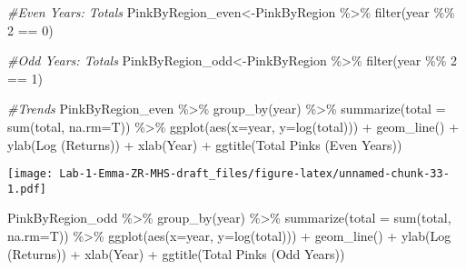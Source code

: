 \documentclass[
]{article}
\newenvironment{Shaded}{\begin{snugshade}}{\end{snugshade}}
\newcommand{\AttributeTok}[1]{\textcolor[rgb]{0.77,0.63,0.00}{#1}}
\newcommand{\CommentTok}[1]{\textcolor[rgb]{0.56,0.35,0.01}{\textit{#1}}}
\newcommand{\DecValTok}[1]{\textcolor[rgb]{0.00,0.00,0.81}{#1}}
\newcommand{\FunctionTok}[1]{\textcolor[rgb]{0.00,0.00,0.00}{#1}}
\newcommand{\NormalTok}[1]{#1}
\newcommand{\OtherTok}[1]{\textcolor[rgb]{0.56,0.35,0.01}{#1}}
\newcommand{\SpecialCharTok}[1]{\textcolor[rgb]{0.00,0.00,0.00}{#1}}
\newcommand{\StringTok}[1]{\textcolor[rgb]{0.31,0.60,0.02}{#1}}
\begin{document}
\begin{Shaded}
\begin{Highlighting}[]
\CommentTok{\#Even Years: Totals }
\NormalTok{PinkByRegion\_even}\OtherTok{\textless{}{-}}\NormalTok{PinkByRegion }\SpecialCharTok{\%\textgreater{}\%} 
  \FunctionTok{filter}\NormalTok{(year }\SpecialCharTok{\%\%} \DecValTok{2} \SpecialCharTok{==} \DecValTok{0}\NormalTok{)}

\CommentTok{\#Odd Years: Totals }
\NormalTok{PinkByRegion\_odd}\OtherTok{\textless{}{-}}\NormalTok{PinkByRegion }\SpecialCharTok{\%\textgreater{}\%} 
  \FunctionTok{filter}\NormalTok{(year }\SpecialCharTok{\%\%} \DecValTok{2} \SpecialCharTok{==} \DecValTok{1}\NormalTok{)}

\CommentTok{\#Trends}
\NormalTok{PinkByRegion\_even }\SpecialCharTok{\%\textgreater{}\%}
  \FunctionTok{group\_by}\NormalTok{(year) }\SpecialCharTok{\%\textgreater{}\%}
  \FunctionTok{summarize}\NormalTok{(}\AttributeTok{total =} \FunctionTok{sum}\NormalTok{(total, }\AttributeTok{na.rm=}\NormalTok{T)) }\SpecialCharTok{\%\textgreater{}\%}
  \FunctionTok{ggplot}\NormalTok{(}\FunctionTok{aes}\NormalTok{(}\AttributeTok{x=}\NormalTok{year, }\AttributeTok{y=}\FunctionTok{log}\NormalTok{(total))) }\SpecialCharTok{+}
  \FunctionTok{geom\_line}\NormalTok{() }\SpecialCharTok{+}
  \FunctionTok{ylab}\NormalTok{(}\StringTok{\textquotesingle{}Log (Returns)\textquotesingle{}}\NormalTok{) }\SpecialCharTok{+}
  \FunctionTok{xlab}\NormalTok{(}\StringTok{\textquotesingle{}Year\textquotesingle{}}\NormalTok{) }\SpecialCharTok{+}
  \FunctionTok{ggtitle}\NormalTok{(}\StringTok{\textquotesingle{}Total Pinks (Even Years)\textquotesingle{}}\NormalTok{)}
\end{Highlighting}
\end{Shaded}

\texttt{[image: Lab-1-Emma-ZR-MHS-draft\_files/figure-latex/unnamed-chunk-33-1.pdf]}

\begin{Shaded}
\begin{Highlighting}[]
\NormalTok{PinkByRegion\_odd }\SpecialCharTok{\%\textgreater{}\%}
  \FunctionTok{group\_by}\NormalTok{(year) }\SpecialCharTok{\%\textgreater{}\%}
  \FunctionTok{summarize}\NormalTok{(}\AttributeTok{total =} \FunctionTok{sum}\NormalTok{(total, }\AttributeTok{na.rm=}\NormalTok{T)) }\SpecialCharTok{\%\textgreater{}\%}
  \FunctionTok{ggplot}\NormalTok{(}\FunctionTok{aes}\NormalTok{(}\AttributeTok{x=}\NormalTok{year, }\AttributeTok{y=}\FunctionTok{log}\NormalTok{(total))) }\SpecialCharTok{+}
  \FunctionTok{geom\_line}\NormalTok{() }\SpecialCharTok{+}
  \FunctionTok{ylab}\NormalTok{(}\StringTok{\textquotesingle{}Log (Returns)\textquotesingle{}}\NormalTok{) }\SpecialCharTok{+}
  \FunctionTok{xlab}\NormalTok{(}\StringTok{\textquotesingle{}Year\textquotesingle{}}\NormalTok{) }\SpecialCharTok{+}
  \FunctionTok{ggtitle}\NormalTok{(}\StringTok{\textquotesingle{}Total Pinks (Odd Years)\textquotesingle{}}\NormalTok{)}
\end{Highlighting}
\end{Shaded}
\end{document}
